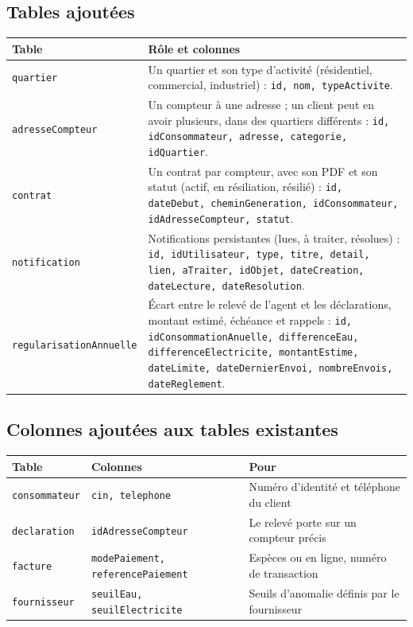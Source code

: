 \documentclass[11pt,a4paper]{article}
\begin{document}
\subsection*{Tables ajoutées}
\begin{center}\small
\begin{tabularx}{\linewidth}{lX}
\toprule
\textbf{Table} & \textbf{Rôle et colonnes} \\
\midrule
\texttt{quartier} & Un quartier et son type d'activité (résidentiel, commercial, industriel) : \texttt{id, nom, typeActivite}. \\
\texttt{adresseCompteur} & Un compteur à une adresse ; un client peut en avoir plusieurs, dans des quartiers différents :
\texttt{id, idConsommateur, adresse, categorie, idQuartier}. \\
\texttt{contrat} & Un contrat par compteur, avec son PDF et son statut (actif, en résiliation, résilié) :
\texttt{id, dateDebut, cheminGeneration, idConsommateur, idAdresseCompteur, statut}. \\
\texttt{notification} & Notifications persistantes (lues, à traiter, résolues) :
\texttt{id, idUtilisateur, type, titre, detail, lien, aTraiter, idObjet, dateCreation, dateLecture, dateResolution}. \\
\texttt{regularisationAnnuelle} & Écart entre le relevé de l'agent et les déclarations, montant estimé, échéance et rappels :
\texttt{id, idConsommationAnuelle, differenceEau, differenceElectricite, montantEstime, dateLimite, dateDernierEnvoi, nombreEnvois, dateReglement}. \\
\bottomrule
\end{tabularx}
\end{center}

\subsection*{Colonnes ajoutées aux tables existantes}
\begin{center}\small
\begin{tabular}{lll}
\toprule
\textbf{Table} & \textbf{Colonnes} & \textbf{Pour} \\
\midrule
\texttt{consommateur} & \texttt{cin, telephone} & Numéro d'identité et téléphone du client \\
\texttt{declaration} & \texttt{idAdresseCompteur} & Le relevé porte sur un compteur précis \\
\texttt{facture} & \texttt{modePaiement, referencePaiement} & Espèces ou en ligne, numéro de transaction \\
\texttt{fournisseur} & \texttt{seuilEau, seuilElectricite} & Seuils d'anomalie définis par le fournisseur \\
\bottomrule
\end{tabular}
\end{center}
\end{document}
